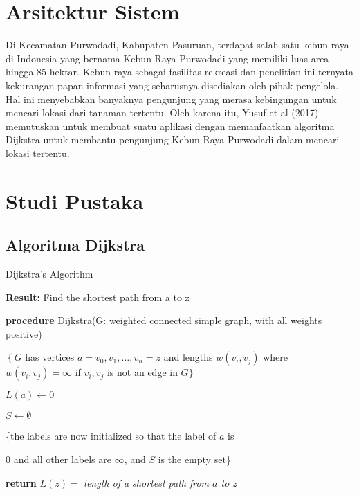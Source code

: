 \documentclass[conference]{IEEEtran}
\begin{document}
\section{Arsitektur Sistem}
Di Kecamatan Purwodadi, Kabupaten Pasuruan, terdapat
salah satu kebun raya di Indonesia yang bernama Kebun
Raya Purwodadi yang memiliki luas area hingga 85 hektar.
Kebun raya sebagai fasilitas rekreasi dan penelitian ini ternyata
kekurangan papan informasi yang seharusnya disediakan oleh
pihak pengelola. Hal ini menyebabkan banyaknya pengunjung
yang merasa kebingungan untuk mencari lokasi dari tanaman
tertentu. Oleh karena itu, Yusuf et al (2017) memutuskan
untuk membuat suatu aplikasi dengan memanfaatkan algoritma
Dijkstra untuk membantu pengunjung Kebun Raya Purwodadi
dalam mencari lokasi tertentu.


\section{Studi Pustaka}
\subsection{Algoritma Dijkstra}

\begin{algorithm}

\caption{Dijkstra’s Algorithm}
\label{alg:two}

\textbf{Result:} Find the shortest path from a to $\mathrm{z}$

\textbf{procedure} Dijkstra(G: weighted connected simple graph, with all weights positive)

$\left\{G\right.$ has vertices $a=v_{0}, v_{1}, \ldots, v_{n}=z$ and lengths $w\left(v_{i}, v_{j}\right)$ where $w\left(v_{i}, v_{j}\right)=\infty$ if $v_{i}, v_{j}$ is not an edge in $G\}$


$L(a)\gets0$

$S\gets\emptyset$

\{the labels are now initialized so that the label of $a$ is

0 and all other labels are $\infty$, and $S$ is the empty set\}

\textbf{return} $L(z) =$ \textit{length of a shortest path from $a$ to $z$}
\end{algorithm}
\end{document}
